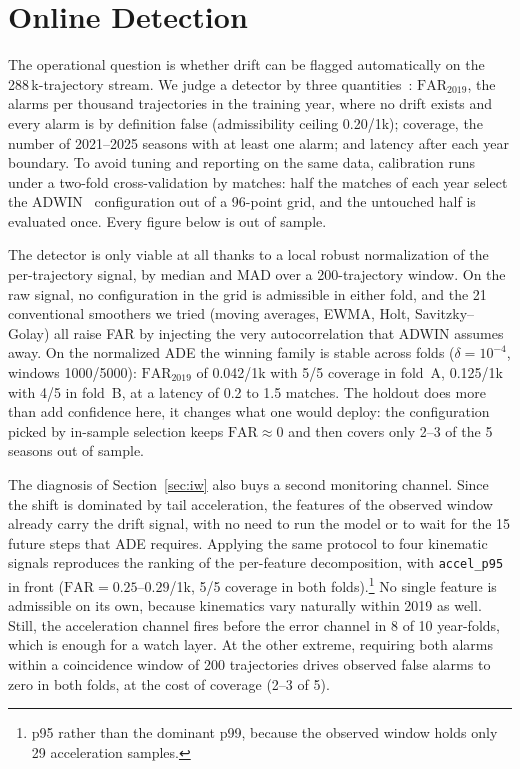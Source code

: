 \documentclass[conference]{IEEEtran}
\begin{document}
\section{Online Detection}
\label{sec:detection}

The operational question is whether drift can be flagged automatically on the
288\,k-trajectory stream. We judge a detector by three quantities~\cite{lu2019}:
$\mathrm{FAR}_{2019}$, the alarms per thousand trajectories in the training
year, where no drift exists and every alarm is by definition false
(admissibility ceiling 0.20/1k); coverage, the number of 2021--2025 seasons with
at least one alarm; and latency after each year boundary. To avoid tuning and
reporting on the same data, calibration runs under a two-fold cross-validation
by matches: half the matches of each year select the ADWIN~\cite{adwin}
configuration out of a 96-point grid, and the untouched half is evaluated once.
Every figure below is out of sample.

The detector is only viable at all thanks to a local robust normalization of the
per-trajectory signal, by median and MAD over a 200-trajectory window. On the
raw signal, no configuration in the grid is admissible in either fold, and the
21 conventional smoothers we tried (moving averages, EWMA, Holt,
Savitzky--Golay) all raise FAR by injecting the very autocorrelation that ADWIN
assumes away. On the normalized ADE the winning family is stable across folds
($\delta = 10^{-4}$, windows 1000/5000): $\mathrm{FAR}_{2019}$ of 0.042/1k with
5/5 coverage in fold~A, 0.125/1k with 4/5 in fold~B, at a latency of 0.2 to 1.5
matches. The holdout does more than add confidence here, it changes what one
would deploy: the configuration picked by in-sample selection keeps
$\mathrm{FAR} \approx 0$ and then covers only 2--3 of the 5 seasons out of
sample.

The diagnosis of Section~\ref{sec:iw} also buys a second monitoring channel.
Since the shift is dominated by tail acceleration, the features of the observed
window already carry the drift signal, with no need to run the model or to wait
for the 15 future steps that ADE requires. Applying the same protocol to four
kinematic signals reproduces the ranking of the per-feature decomposition, with
\texttt{accel\_p95} in front ($\mathrm{FAR} = 0.25$--$0.29$/1k, 5/5 coverage in
both folds).\footnote{p95 rather than the dominant p99, because the observed
window holds only 29 acceleration samples.} No single feature is admissible on
its own, because kinematics vary naturally within 2019 as well. Still, the
acceleration channel fires before the error channel in 8 of 10 year-folds, which
is enough for a watch layer. At the other extreme, requiring both alarms within
a coincidence window of 200 trajectories drives observed false alarms to zero in
both folds, at the cost of coverage (2--3 of 5).
\end{document}
